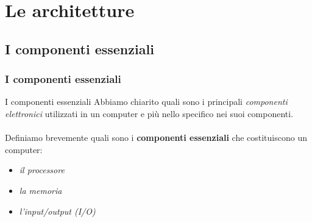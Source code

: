 \section[Le architetture]{Le architetture}
\label{sec:architectures}


\subsection[I componenti essenziali]{I componenti essenziali}
\begin{frame}
	\frametitle{I componenti essenziali}
	
	\begin{block}{I componenti essenziali}
		Abbiamo chiarito quali sono i principali \textit{componenti elettronici} utilizzati in un computer e più nello specifico nei suoi componenti.\\~\\
		Definiamo brevemente quali sono i \textbf{componenti essenziali} che costituiscono un computer:
		\begin{itemize}
			\item \textit{il processore}
			\item \textit{la memoria}
			\item \textit{l'input/output (I/O)}
		\end{itemize}
		
	\end{block}
	
\end{frame}



%	
%	
%	


